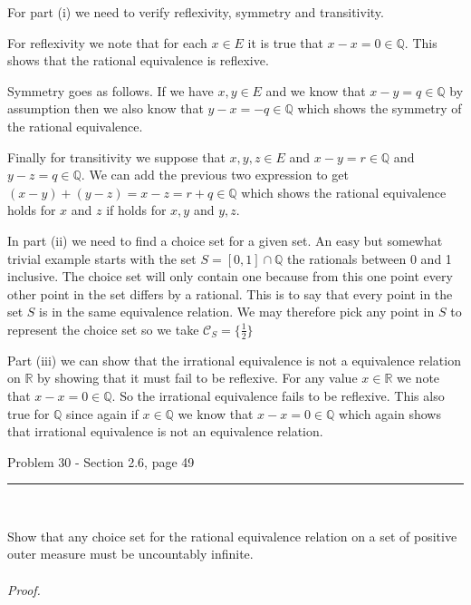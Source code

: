 \documentclass[11pt,reqno]{article}
\begin{document}
\noindent For part (i) we need to verify reflexivity, symmetry and transitivity. 

For reflexivity we note that for each $x \in E$ it is true that $x - x = 0 \in \mathbb{Q}$. This shows that the rational equivalence is reflexive. 

\noindent Symmetry goes as follows. If we have $x, y \in E$ and we know that $x - y = q \in \mathbb{Q}$ by assumption then we also know that $y - x = -q \in \mathbb{Q}$ which shows the symmetry of the rational equivalence. 

\noindent Finally for transitivity we suppose that $x, y, z \in E$ and $x - y = r \in \mathbb{Q}$ and $y - z = q \in \mathbb{Q}$. We can add the previous two expression to get $(x - y) + (y - z) = x - z = r + q \in \mathbb{Q}$ which shows the rational equivalence holds for $x$ and $z$ if holds for $x, y$ and $y, z$. 

In part (ii) we need to find a choice set for a given set. An easy but somewhat trivial example starts with the set $S = [0,1] \cap \mathbb{Q}$ the rationals between 0 and 1 inclusive. The choice set will only contain one because from this one point every other point in the set differs by a rational. This is to say that every point in the set $S$ is in the same equivalence relation. We may therefore pick any point in $S$ to represent the choice set so we take $\mathcal{C}_S = \{ \frac{1}{2} \}$

Part (iii) we can show that the irrational equivalence is not a equivalence relation on $\mathbb{R}$ by showing that it must fail to be reflexive. For any value $x \in \mathbb{R}$ we note that $x - x = 0 \in \mathbb{Q}$. So the irrational equivalence fails to be reflexive. This also true for $\mathbb{Q}$ since again if $x \in \mathbb{Q}$ we know that $x - x = 0 \in \mathbb{Q}$ which again shows that irrational equivalence is not an equivalence relation.

\begin{flushleft} 
Problem 30 - Section 2.6, page 49\\
\rule{500pt}{1pt}\\
\end{flushleft} 

Show that any choice set for the rational equivalence relation on a set of positive outer measure must be uncountably infinite.
\\\\ \emph{Proof.}
\end{document}
